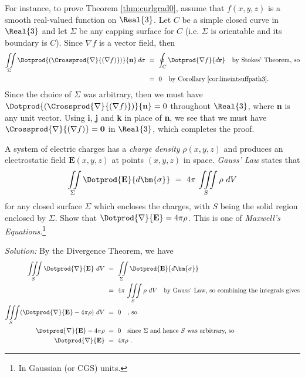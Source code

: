 For instance, to prove Theorem \ref{thm:curlgrad0}, assume that $f(x,y,z)$ is a smooth real-valued function on
$\Real{3}$. Let $C$ be a simple closed curve in $\Real{3}$ and let $\Sigma$ be any capping surface for $C$ (i.e.
$\Sigma$ is orientable and its boundary is $C$). Since $\nabla f$ is a vector field, then
\begin{align*}
 \iint\limits_{\Sigma} \Dotprod{\left( \Crossprod{\nabla}{(\nabla f)} \right) }{\textbf{n}}\,d\sigma ~&=~
  \oint_{C}\Dotprod{\nabla f}{d\textbf{r}} \quad\text{by Stokes' Theorem, so}\\
 &=~ 0 \quad\text{by Corollary \ref{cor:lineintsuffpath3}.}
\end{align*}
Since the choice of $\Sigma$ was arbitrary, then we must have $\Dotprod{(\Crossprod{\nabla}{(\nabla f)})}{\textbf{n}}
= 0$ throughout $\Real{3}$, where \textbf{n} is any unit vector. Using \textbf{i}, \textbf{j} and \textbf{k} in place of
\textbf{n}, we see that we must have $\Crossprod{\nabla}{(\nabla f)} = \textbf{0}$ in $\Real{3}$, which completes the
proof.


\begin{exa}
 A system of electric charges has a \emph{charge density} $\rho (x,y,z)$ and produces an electrostatic field
 $\textbf{E}(x,y,z)$ at points $(x,y,z)$ in space. \emph{Gauss' Law} states that
 \begin{displaymath}
  \iint\limits_{\Sigma} \Dotprod{\textbf{E}}{d\bm{\sigma}} ~=~ 4\pi\,\iiint\limits_{S} \rho ~dV
 \end{displaymath}
 for any closed surface $\Sigma$ which encloses the charges, with $S$ being the solid region enclosed by $\Sigma$.
 Show that $\Dotprod{\nabla}{\textbf{E}} = 4\pi\rho$. This is one of \emph{Maxwell's Equations}.\footnote{In Gaussian
 (or CGS) units.}\vspace{1mm}
 \par\noindent\emph{Solution:} By the Divergence Theorem, we have
 \begin{align*}
  \iiint\limits_{S} \Dotprod{\nabla}{\textbf{E}} ~dV ~&=~ \iint\limits_{\Sigma} \Dotprod{\textbf{E}}{d\bm{\sigma}}\\
   &=~ 4\pi\,\iiint\limits_{S} \rho ~dV \quad\text{by Gauss' Law, so combining the integrals gives}\\
   \iiint\limits_{S} ( \Dotprod{\nabla}{\textbf{E}} - 4\pi\rho ) ~dV ~&=~ 0 \quad\text{, so}\\
   \Dotprod{\nabla}{\textbf{E}} - 4\pi\rho ~&=~ 0 \quad\text{since $\Sigma$ and hence $S$ was arbitrary, so}\\
   \Dotprod{\nabla}{\textbf{E}} ~&=~ 4\pi\rho ~.
 \end{align*}
\end{exa}
